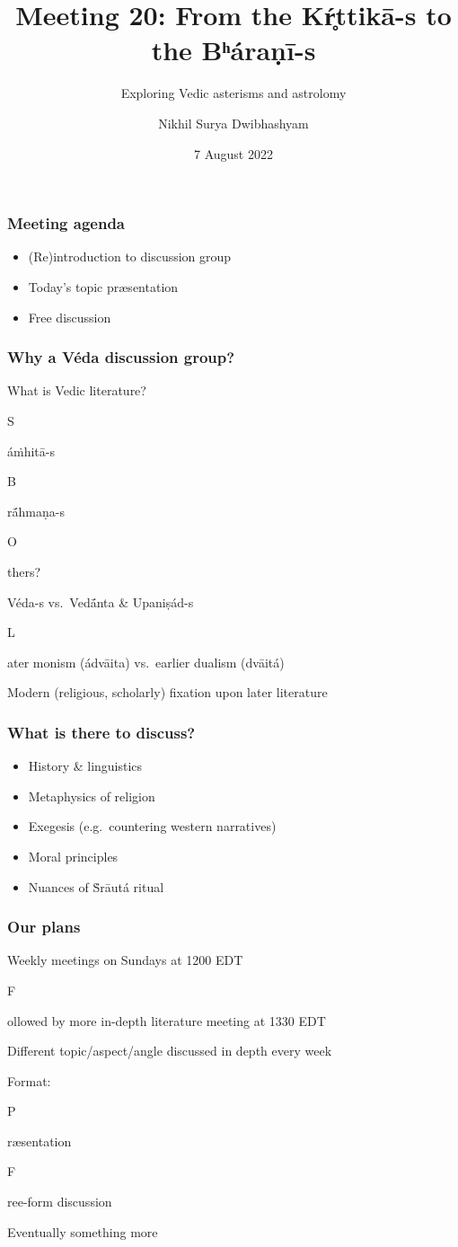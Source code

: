 \documentclass[pdf]{beamer}
\title{Meeting 20: From the Kŕ̥ttikā-s to the Bʰáraṇī-s}
\subtitle{Exploring Vedic asterisms and astrolomy}
\author{Nikhil Surya Dwibhashyam}
\date{7 August 2022}
\newcommand{\Subitem}[1]{{\setlength\itemindent{12pt} \item[-] #1}}
\begin{document}
\frame{\titlepage}

\begin{frame} \frametitle{Meeting agenda}
\begin{itemize}
	\item (Re)introduction to discussion group
	\item Today's topic præsentation
	\item Free discussion
\end{itemize}
\end{frame}

\begin{frame} \frametitle{Why a Véda discussion group?}
\begin{itemize}
	\item What is Vedic literature?
	\Subitem Sáṁhitā-s
	\Subitem Brā́hmaṇa-s
	\Subitem Others?
	\item Véda-s vs.~Vedā́nta \& Upaniṣád-s
	\Subitem Later monism (ádvāita) vs.~earlier dualism (dvāitá)
	\item Modern (religious, scholarly) fixation upon later literature
\end{itemize}
\end{frame}

\begin{frame} \frametitle{What is there to discuss?}
\begin{itemize}
	\item History \& linguistics
	\item Metaphysics of religion
	\item Exegesis (e.g.~countering western narratives)
	\item Moral principles
	\item Nuances of Ṡrāutá ritual
\end{itemize}
\end{frame}

\begin{frame} \frametitle{Our plans}
\begin{itemize}
	\item Weekly meetings on Sundays at 1200 EDT
	\Subitem Followed by more in-depth literature meeting at 1330 EDT
	\item Different topic/aspect/angle discussed in depth every week
	\item Format:
	\Subitem Præsentation
	\Subitem Free-form discussion
	\item Eventually something more
\end{itemize}
\end{frame}
\end{document}

